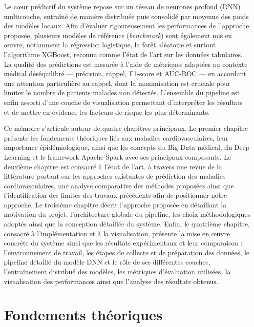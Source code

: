 \documentclass[12pt,a4paper]{report}
\begin{document}
Le c\oe{}ur prédictif du système repose sur un réseau de neurones profond
(\acs{DNN}) multicouche, entraîné de manière distribuée puis consolidé par moyenne
des poids des modèles locaux. Afin d'évaluer rigoureusement les performances de
l'approche proposée, plusieurs modèles de référence (\textit{benchmark}) sont
également mis en œuvre, notamment la régression logistique, la forêt aléatoire et
surtout l'algorithme \acs{XGBoost}, reconnu comme l'état de l'art sur les données
tabulaires. La qualité des prédictions est mesurée à l'aide de métriques adaptées
au contexte médical déséquilibré — précision, rappel, F1-score et \acs{AUC}-\acs{ROC} —
en accordant une attention particulière au rappel, dont la maximisation est cruciale
pour limiter le nombre de patients malades non détectés. L'ensemble du pipeline est
enfin assorti d'une couche de visualisation permettant d'interpréter les résultats
et de mettre en évidence les facteurs de risque les plus déterminants.

Ce mémoire s’articule autour de quatre chapitres principaux. Le premier chapitre présente les fondements théoriques liés aux maladies cardiovasculaires, leur importance épidémiologique, ainsi que les concepts du Big Data médical, du Deep Learning et le framework Apache Spark avec ses principaux composants. Le deuxième chapitre est consacré à l’état de l’art, à travers une revue de la littérature portant sur les approches existantes de prédiction des maladies cardiovasculaires, une analyse comparative des méthodes proposées ainsi que l’identification des limites des travaux précédents afin de positionner notre approche. Le troisième chapitre décrit l’approche proposée en détaillant la motivation du projet, l’architecture globale du pipeline, les choix méthodologiques adoptés ainsi que la conception détaillée du système. Enfin, le quatrième chapitre, consacré à l’implémentation et à la visualisation, présente la mise en œuvre concrète du système ainsi que les résultats expérimentaux et leur comparaison : l’environnement de travail, les étapes de collecte et de préparation des données, le pipeline détaillé du modèle \acs{DNN} et le rôle de ses différentes couches, l’entraînement distribué des modèles, les métriques d’évaluation utilisées, la visualisation des performances ainsi que l’analyse des résultats obtenus.

\chapter{Fondements théoriques}
\end{document}

